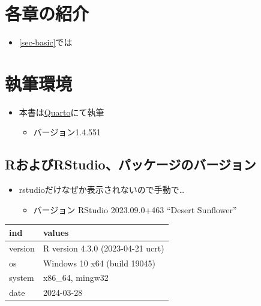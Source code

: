 \documentclass[
  b5paper,
  xelatex, ja=standard]{bxjsbook}
\providecommand{\tightlist}{%
  \setlength{\itemsep}{0pt}\setlength{\parskip}{0pt}}\usepackage{longtable,booktabs,array}
\begin{document}
\section*{各章の紹介}\label{ux5404ux7ae0ux306eux7d39ux4ecb}


\begin{itemize}
\tightlist
\item
  \ref{sec-basic}では
\end{itemize}

\section*{執筆環境}\label{ux57f7ux7b46ux74b0ux5883}


\begin{itemize}
\tightlist
\item
  本書は\href{https://quarto.org/}{Quarto}にて執筆

  \begin{itemize}
  \tightlist
  \item
    バージョン1.4.551
  \end{itemize}
\end{itemize}

\subsection*{RおよびRStudio、パッケージのバージョン}\label{rux304aux3088ux3073rstudioux30d1ux30c3ux30b1ux30fcux30b8ux306eux30d0ux30fcux30b8ux30e7ux30f3}

\begin{itemize}
\tightlist
\item
  rstudioだけなぜか表示されないので手動で\ldots{}

  \begin{itemize}
  \tightlist
  \item
    バージョン RStudio 2023.09.0+463 ``Desert Sunflower''
  \end{itemize}
\end{itemize}

\begin{table}
\centering
\begin{tabular}{l|l}
\hline
ind & values\\
\hline
version & R version 4.3.0 (2023-04-21 ucrt)\\
\hline
os & Windows 10 x64 (build 19045)\\
\hline
system & x86\_64, mingw32\\
\hline
date & 2024-03-28\\
\hline
\end{tabular}
\end{table}
\end{document}
